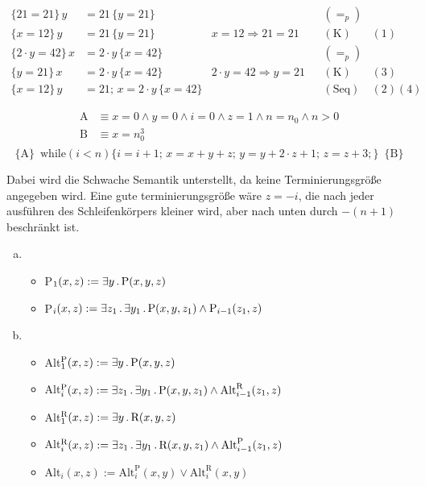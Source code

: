 


\date{Donnerstag 9.1.2020}


\maketitle
\thispagestyle{fancy}

\begin{align}
	\{21=21\}\, y &= 21\,  \{y=21\} & & & (=_p) \\
	\{x=12\}\, y &= 21\,  \{y=21\} & x=12 \Rightarrow 21 = 21 && (\text{K})&(1) \\
	\{2\cdot y = 42\}\, x &= 2\cdot y\,  \{x=42\} & & & (=_p) \\
	\{y=21\}\, x &= 2\cdot y\,  \{x=42\} & 2\cdot y = 42 \Rightarrow y = 21 && (\text{K})&(3) \\
	\{x=12\}\, y &= 21;\, x = 2\cdot y\,  \{x=42\} & & & (\text{Seq})&(2)(4) 
\end{align}

\begin{align*}
	\text{A} &\equiv x = 0 \land y = 0 \land i = 0 \land z = 1 \land n = n_0 \land n > 0 \\
	\text{B} &\equiv x = n_0^3\\
\end{align*}
$$ \{\text{A}\}\,\,\, \text{while}(i < n) \{i=i+1;\,x=x+y+z;\,y=y+2 \cdot z + 1;\,z=z+3;\}\,\,\, \{\text{B}\} $$

Dabei wird die Schwache Semantik unterstellt, da keine Terminierungsgröße 
angegeben wird. Eine gute terminierungsgröße wäre $z=-i$, die nach jeder ausführen 
des Schleifenkörpers kleiner wird, aber nach unten durch $-(n+1)$ beschränkt ist.
\begin{enumerate}[a)]
	\item \begin{itemize}
		\item P$_1(x,z) := \exists y \, . \, \text{P}(x,y,z)$
		\item P$_i(x,z) := \exists z_1 \, . \,\exists y_1 \, . \, \text{P}(x,y,z_1) \land \text{P}_{i-1}(z_1,z)$
	\end{itemize}
	\item \begin{itemize}
		\item Alt$^\text{P}_1(x,z) := \exists y \, . \, \text{P}(x,y,z)$
		\item Alt$^\text{P}_i(x,z) := \exists z_1 \, . \,\exists y_1 \, . \, \text{P}(x,y,z_1) \land \text{Alt}^\text{R}_{i-1}(z_1,z)$
		\item Alt$^\text{R}_1(x,z) := \exists y \, . \, \text{R}(x,y,z)$
		\item Alt$^\text{R}_i(x,z) := \exists z_1 \, . \,\exists y_1 \, . \, \text{R}(x,y,z_1) \land \text{Alt}^\text{P}_{i-1}(z_1,z)$
		\item Alt$_i(x,z) := \text{Alt}^\text{P}_i(x,y) \lor \text{Alt}^\text{R}_i(x,y) $
	\end{itemize}
\end{enumerate}


\vfill\centering

